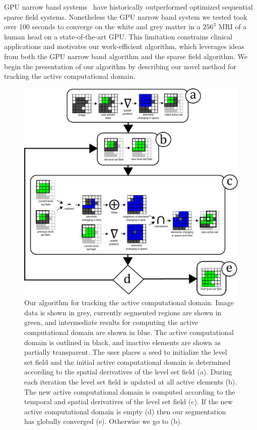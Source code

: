 \documentclass{egpubl}
\begin{document}
GPU narrow band systems~\cite{Lefohn-2003-MICCAI,Lefohn-2003-Vis,Cates-2004,Lefohn-2004,Jeong-2009} have historically outperformed optimized sequential sparse field systems. Nonetheless the GPU narrow band system we tested took over 100 seconds to converge on the white and grey matter in a ${256}^3$ MRI of a human head on a state-of-the-art GPU. This limitation constrains clinical applications and motivates our work-efficient algorithm, which leverages ideas from both the GPU narrow band algorithm and the sparse field algorithm. We begin the presentation of our algorithm by describing our novel method for tracking the active computational domain.


\begin{figure}[t]
\centering
\includegraphics[width=6.0in]{figures/Algorithm.pdf}
\caption{Our algorithm for tracking the active computational domain. Image data is shown in grey, currently segmented regions are shown in green, and intermediate results for computing the active computational domain are shown in blue. The active computational domain is outlined in black, and inactive elements are shown as partially transparent. The user places a seed to initialize the level set field and the initial active computational domain is determined according to the spatial derivatives of the level set field (a). During each iteration the level set field is updated at all active elements (b). The new active computational domain is computed according to the temporal and spatial derivatives of the level set field (c). If the new active computational domain is empty (d) then our segmentation has globally converged (e). Otherwise we go to (b). }
\label{fig:1}
\end{figure}
\end{document}
